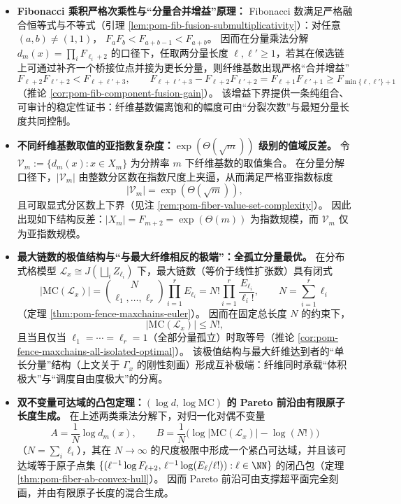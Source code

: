 \begin{enumerate}
\begin{itemize}
    \item \textbf{Fibonacci 乘积严格次乘性与“分量合并增益”原理：}
    Fibonacci 数满足严格融合恒等式与不等式（引理 \ref{lem:pom-fib-fusion-submultiplicativity}）：对任意 \((a,b)\neq(1,1)\)，
    \(
    F_aF_b< F_{a+b-1}<F_{a+b}
    \)。
    因而在分量乘法分解 \(d_m(x)=\prod_i F_{\ell_i+2}\) 的口径下，任取两分量长度 \(\ell,\ell'\ge 1\)，若其在候选链上可通过补齐一个桥接位点并接为更长分量，则纤维基数出现严格“合并增益”
    \[
    F_{\ell+2}F_{\ell'+2}<F_{\ell+\ell'+3},\qquad
    F_{\ell+\ell'+3}-F_{\ell+2}F_{\ell'+2}=F_{\ell+1}F_{\ell'+1}\ge F_{\min\{\ell,\ell'\}+1}
    \]
    （推论 \ref{cor:pom-fib-component-fusion-gain}）。
    该增益下界提供一条纯组合、可审计的稳定性证书：纤维基数偏离饱和的幅度可由“分裂次数”与最短分量长度共同控制。

    \item \textbf{不同纤维基数取值的亚指数复杂度：\texorpdfstring{\(\exp(\Theta(\sqrt m))\)}{exp(Theta(sqrt m))} 级别的值域反差。}
    令 \(\mathcal{V}_m:=\{d_m(x):x\in X_m\}\) 为分辨率 \(m\) 下纤维基数的取值集合。
    在分量分解口径下，\(|\mathcal{V}_m|\) 由整数分区数在指数尺度上夹逼，从而满足严格亚指数标度
    \[
    |\mathcal{V}_m|=\exp(\Theta(\sqrt m)),
    \]
    且可取显式分区数上下界（见注 \ref{rem:pom-fiber-value-set-complexity}）。
    因此出现如下结构反差：\(|X_m|=F_{m+2}=\exp(\Theta(m))\) 为指数规模，而 \(\mathcal{V}_m\) 仅为亚指数规模。

    \item \textbf{最大链数的极值结构与“与最大纤维相反的极端”：全孤立分量最优。}
    在分布式格模型 \(\mathcal L_x\cong J(\bigsqcup_i Z_{\ell_i})\) 下，最大链数（等价于线性扩张数）具有闭式
    \[
    |\mathrm{MC}(\mathcal L_x)|
    =\binom{N}{\ell_1,\dots,\ell_r}\prod_{i=1}^r E_{\ell_i}
    =N!\prod_{i=1}^r\frac{E_{\ell_i}}{\ell_i!},
    \qquad N=\sum_{i=1}^r \ell_i
    \]
    （定理 \ref{thm:pom-fence-maxchains-euler}）。
    因而在固定总长度 \(N\) 的约束下，
    \[
    |\mathrm{MC}(\mathcal L_x)|\le N!,
    \]
    且当且仅当 \(\ell_1=\cdots=\ell_r=1\)（全部分量孤立）时取等号（推论 \ref{cor:pom-fence-maxchains-all-isolated-optimal}）。
    该极值结构与最大纤维达到者的“单长分量”结构（上文关于 \(\Gamma_x\) 的刚性刻画）形成互补极端：纤维同时承载“体积极大”与“调度自由度极大”的分离。

    \item \textbf{双不变量可达域的凸包定理：\texorpdfstring{\((\log d,\log\mathrm{MC})\)}{(log d, log MC)} 的 Pareto 前沿由有限原子长度生成。}
    在上述两类乘法分解下，对归一化对偶不变量
    \[
    A=\frac{1}{N}\log d_m(x),\qquad
    B=\frac{1}{N}\bigl(\log|\mathrm{MC}(\mathcal L_x)|-\log(N!)\bigr)
    \]
    （\(N=\sum_i\ell_i\)），其在 \(N\to\infty\) 的尺度极限中形成一个紧凸可达域，并且该可达域等于原子点集
    \(
    \{(\ell^{-1}\log F_{\ell+2},\,\ell^{-1}\log(E_\ell/\ell!)):\ell\in\NN\}
    \)
    的闭凸包（定理 \ref{thm:pom-fiber-ab-convex-hull}）。
    因而 Pareto 前沿可由支撑超平面完全刻画，并由有限原子长度的混合生成。


\end{itemize}
\end{enumerate}
